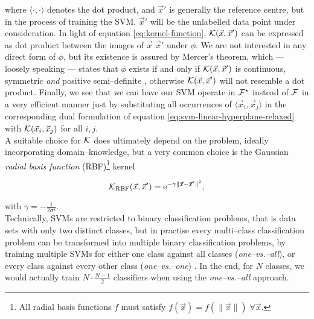 where $\langle \cdot, \cdot \rangle$ denotes the dot product, and $\vec x'$ is generally the reference centre, but in the process of training the SVM, $\vec x'$ will be the unlabelled data point under consideration. In light of equation \eqref{eq:kernel-function}, $\mathcal{K}(\vec x, \vec x')$ can be expressed as dot product between the images of $\vec x$ \resp $\vec x'$ under $\phi$. We are not interested in any direct form of $\phi$, but its existence is assured by Mercer's theorem, which --- loosely speaking --- states that $\phi$ exists if and only if $\mathcal{K}(\vec x, \vec x')$ is continuous, symmetric \emph{and} positive semi--definite \citep{mercer1909}, otherwise $\mathcal{K}(\vec x, \vec x')$ will not resemble a dot product. Finally, we see that we can have our SVM operate in $\mathcal{F}^\star$ instead of $\mathcal{F}$ in a very efficient manner just by substituting all occurrences of $\langle \vec x_i, \vec x_j \rangle$ in the corresponding dual formulation of equation \eqref{eq:svm-linear-hyperplane-relaxed} with $\mathcal{K}({\vec x_i, \vec x_j})$ for all $i,j$. \\
 
A suitable choice for $\mathcal{K}$ does ultimately depend on the problem, ideally incorporating domain--knowledge, but a very common choice is the Gaussian \emph{radial basis function} (RBF)\footnote{All radial basis functions $f$ must satisfy $f(\vec x) = f(\|\vec x\|) \; \forall \vec x$.} kernel

\begin{equation}
\label{eq:rbf}
\mathcal{K}_{\text{RBF}}(\vec x, \vec x') = \mathrm{e}^{-\gamma \| \vec x - \vec x' \|^2},
\end{equation}

with $\gamma = -\frac{1}{2 \sigma^2}$.\\


Technically, SVMs are restricted to binary classification problems, that is data sets with only two distinct classes, but in practise every multi--class classification problem can be transformed into multiple binary classification problems, \eg by training multiple SVMs for either one class against all classes (\emph{one--vs.--all}), or every class against every other class (\emph{one--vs.--one}) \citep{knerr1990}. In the end, for $N$ classes, we would actually train $N \cdot \frac{N-1}{2}$ classifiers when using the \emph{one--vs.--all} approach.


